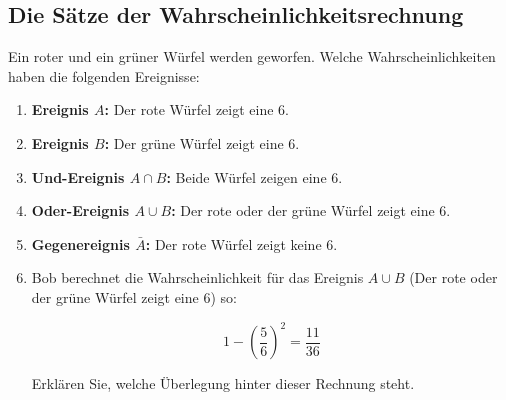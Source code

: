\clearpage
\subsection{Die Sätze der Wahrscheinlichkeitsrechnung}

\begin{LA}
{}{}

Ein roter und ein grüner Würfel werden geworfen. Welche Wahrscheinlichkeiten haben die folgenden Ereignisse:

\begin{enumerate}
    \item \textbf{Ereignis $A$:} Der rote Würfel zeigt eine 6.
    \item \textbf{Ereignis $B$:} Der grüne Würfel zeigt eine 6.
    \item \textbf{Und-Ereignis \(A \cap B\):} Beide Würfel zeigen eine 6.
    \item \textbf{Oder-Ereignis \(A \cup B\):} Der rote oder der grüne Würfel zeigt eine 6.
    \item \textbf{Gegenereignis \(\bar{A}\):} Der rote Würfel zeigt keine 6.
    \item Bob berechnet die Wahrscheinlichkeit für das Ereignis \(A \cup B\) (Der rote oder der grüne Würfel zeigt eine 6) so:

    \[
    1 - \left(\frac{5}{6}\right)^2 = \frac{11}{36}
    \]
    
    Erklären Sie, welche Überlegung hinter dieser Rechnung steht.
\end{enumerate}

\end{LA}
\pagebreak

